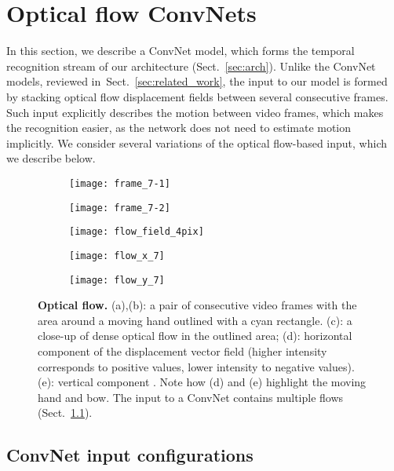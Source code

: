 \documentclass{article} \usepackage{nips14submit_e,times}
\newcommand{\sref}[1]{Sect.~\ref{#1}}
\begin{document}
\section{Optical flow ConvNets}
\label{sec:temp_net}
In this section, we describe a ConvNet model, which forms the temporal recognition stream of our architecture (\sref{sec:arch}).
Unlike the ConvNet models, reviewed in~\sref{sec:related_work}, the input to our model is formed by stacking optical flow displacement fields
between several consecutive frames. Such input explicitly describes the motion between video frames, which makes the recognition easier, as the network does 
not need to estimate motion implicitly. We consider several variations of the optical flow-based input, which we describe below. 
\begin{figure}[ht]
\centering
\begin{subfigure}[b]{0.19\textwidth}
\texttt{[image: frame\_7-1]}
\caption{}
\end{subfigure}
\begin{subfigure}[b]{0.19\textwidth}
\texttt{[image: frame\_7-2]}
\caption{}
\end{subfigure}
\begin{subfigure}[b]{0.19\textwidth}
\texttt{[image: flow\_field\_4pix]}
\caption{}
\end{subfigure}
\begin{subfigure}[b]{0.19\textwidth}
\texttt{[image: flow\_x\_7]}
\caption{}
\end{subfigure}
\begin{subfigure}[b]{0.19\textwidth}
\texttt{[image: flow\_y\_7]}
\caption{}
\end{subfigure}
\caption{\textbf{Optical flow.} 
(a),(b): a pair of consecutive video frames with the area around a moving hand outlined with a cyan rectangle.
(c): a close-up of dense optical flow in the outlined area; 
(d): horizontal component  of the displacement vector field (higher intensity corresponds to positive values, lower intensity to negative values).
(e): vertical component .
Note how (d) and (e) highlight the moving hand and bow. The input to a ConvNet contains multiple flows (\sref{sec:temp_net_input}).
}
\label{fig:flow_vis}
\end{figure}


\subsection{ConvNet input configurations}
\label{sec:temp_net_input}
\end{document}
